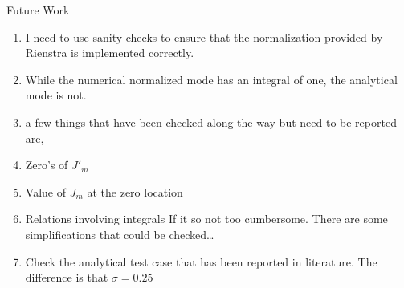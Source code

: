 \begin{frame}{Future Work}
    \begin{alertblock}{}
    \begin{enumerate}[<+->]\itemsep9pt
        \item I need to use sanity checks to ensure that the normalization provided
            by Rienstra is implemented correctly.
        \item While the numerical normalized mode has an integral of one, the 
            analytical mode is not.
        \item a few things that have been checked along the way but need to be 
            reported are,
        \item Zero's of $J'_m$ 
        \item Value of $J_m$ at the zero location
        \item Relations involving integrals If it so not too cumbersome.
            There are some simplifications that could be checked\ldots 
        \item Check the analytical test case that has been reported in literature.
           The difference is that $\sigma = 0.25$
    \end{enumerate}
    \end{alertblock}

    \tiny
\end{frame}



